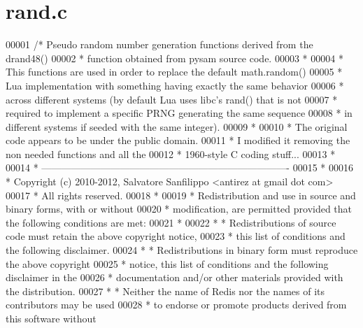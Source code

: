 \hypertarget{rand_8c_source}{}\section{rand.\+c}
\label{rand_8c_source}

\begin{DoxyCode}
00001 \textcolor{comment}{/* Pseudo random number generation functions derived from the drand48()}
00002 \textcolor{comment}{ * function obtained from pysam source code.}
00003 \textcolor{comment}{ *}
00004 \textcolor{comment}{ * This functions are used in order to replace the default math.random()}
00005 \textcolor{comment}{ * Lua implementation with something having exactly the same behavior}
00006 \textcolor{comment}{ * across different systems (by default Lua uses libc's rand() that is not}
00007 \textcolor{comment}{ * required to implement a specific PRNG generating the same sequence}
00008 \textcolor{comment}{ * in different systems if seeded with the same integer).}
00009 \textcolor{comment}{ *}
00010 \textcolor{comment}{ * The original code appears to be under the public domain.}
00011 \textcolor{comment}{ * I modified it removing the non needed functions and all the}
00012 \textcolor{comment}{ * 1960-style C coding stuff...}
00013 \textcolor{comment}{ *}
00014 \textcolor{comment}{ * ----------------------------------------------------------------------------}
00015 \textcolor{comment}{ *}
00016 \textcolor{comment}{ * Copyright (c) 2010-2012, Salvatore Sanfilippo <antirez at gmail dot com>}
00017 \textcolor{comment}{ * All rights reserved.}
00018 \textcolor{comment}{ *}
00019 \textcolor{comment}{ * Redistribution and use in source and binary forms, with or without}
00020 \textcolor{comment}{ * modification, are permitted provided that the following conditions are met:}
00021 \textcolor{comment}{ *}
00022 \textcolor{comment}{ *   * Redistributions of source code must retain the above copyright notice,}
00023 \textcolor{comment}{ *     this list of conditions and the following disclaimer.}
00024 \textcolor{comment}{ *   * Redistributions in binary form must reproduce the above copyright}
00025 \textcolor{comment}{ *     notice, this list of conditions and the following disclaimer in the}
00026 \textcolor{comment}{ *     documentation and/or other materials provided with the distribution.}
00027 \textcolor{comment}{ *   * Neither the name of Redis nor the names of its contributors may be used}
00028 \textcolor{comment}{ *     to endorse or promote products derived from this software without}

\end{DoxyCode}
